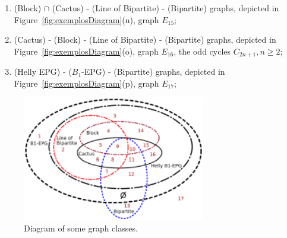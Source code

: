 \documentclass{dmgt}
\begin{document}
\begin{enumerate}[label=(\arabic*)]
      \item (Block) $\cap$  (Cactus) -  (Line of Bipartite) - (Bipartite) graphs, depicted in Figure~\ref{fig:exemplosDiagram}(n), graph $E_{15}$;%
      \item (Cactus) - (Block) -  (Line of Bipartite) - (Bipartite) graphs, depicted in Figure~\ref{fig:exemplosDiagram}(o), graph $E_{16}$, the odd cycles $C_{2n+1},n\geq 2$;%
      \item (Helly EPG) - ($B_1$-EPG)  - (Bipartite) graphs, depicted in Figure~\ref{fig:exemplosDiagram}(p), graph  $E_{17}$;%
\end{enumerate}

%
 \begin{figure}[htb]	
 \center%
 \includegraphics[width=8cm]{diagram.pdf}
 \caption{Diagram of some graph classes.}
\label{fig:diagram}
\end{figure}  
\end{document}
